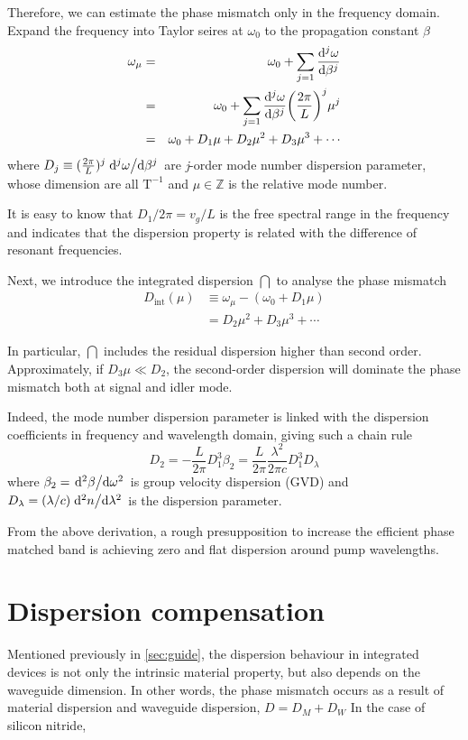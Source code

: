 Therefore, we can estimate the phase mismatch only in the frequency domain. Expand the frequency into Taylor seires at $\omega_0$ to the propagation constant $\beta$
\begin{eqnarray}
  \omega_{\mu} & = & \omega_0 
  + \sum_{j=1}\dv[j]{\omega}{\beta} (\beta_{\mu}-\beta_0) \\
  & = & \omega_0 
  + \sum_{j=1}\dv[j]{\omega}{\beta} \qty(\frac{2 \pi}{L})^j \mu^j \nonumber \\
  & = & \omega_0 + D_1 \mu + D_2 \mu^2 + D_3 \mu^3 + \cdots \nonumber
\end{eqnarray}
where $D_j \equiv  (\frac{2 \pi}{L})^j\dv*[j]{\omega}{\beta}$ are \textit{j}-order mode number dispersion parameter, whose dimension are all $\mathrm{T}^{-1}$ and $\mu \in \mathbb{Z}$ is the relative mode number. 

It is easy to know that $D_1 / 2 \pi = v_g / L$ is the free spectral range in the frequency and indicates that the dispersion property is related with the difference of resonant frequencies.   

Next, we introduce the integrated dispersion $\dint$ \cite{Brasch2014a} to analyse the phase mismatch
\begin{align}\label{eq:def-dint}
    D_\mathrm{int}(\mu) &\equiv \omega_{\mu} - (\omega_0 + D_1 \mu)  \\
    &= D_2 \mu^2 + D_3 \mu^3 + \cdots \nonumber
\end{align}

In particular, $\dint$ includes the residual dispersion higher than second order. Approximately, if $D_3 \mu \ll D_2$, the second-order dispersion will dominate the phase mismatch both at signal and idler mode.

Indeed, the mode number dispersion parameter is linked with the dispersion coefficients in frequency and wavelength domain, giving such a chain rule
\begin{equation}\label{eq:disp-chain}
    D_2 = - \frac{L}{2\pi} {D_1^3}{\beta_2} = \frac{L}{2\pi}  \frac{\lambda^2}{2\pi c} {D_1^3} D_{\lambda}
\end{equation}
where $\beta_2=\dv*[2]{\beta}{\omega}$ is group velocity dispersion (GVD) and $D_{\lambda}=(\lambda/c)\dv*[2]{n}{\lambda}$ is the dispersion parameter.

From the above derivation, a rough presupposition to increase the efficient phase matched band is achieving zero and flat dispersion around pump wavelengths.

\section{Dispersion compensation}
Mentioned previously in \autoref{sec:guide}, the dispersion behaviour in integrated devices is not only the intrinsic material property, but also depends on the waveguide dimension. In other words, the phase mismatch occurs as a result of material dispersion and waveguide dispersion, $D= D_M + D_W$
In the case of silicon nitride, 

